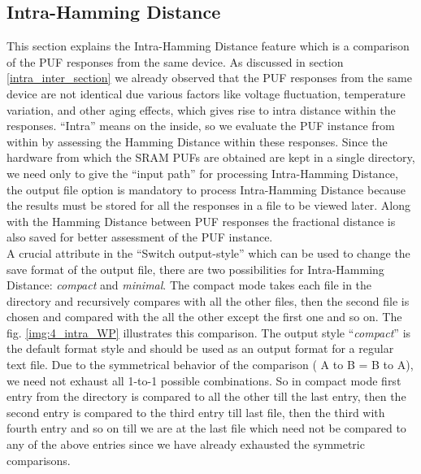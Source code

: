 \subsection{Intra-Hamming Distance}
\label{intra_hd_section}
This section explains the Intra-Hamming Distance feature which is a comparison of the PUF responses from the same device. As discussed in section \ref{intra_inter_section} we already observed that the PUF responses from the same device are not identical due various factors like voltage fluctuation,  temperature variation, and other aging effects, which gives rise to intra distance within the responses. ``Intra'' means on the inside, so we evaluate the PUF instance from within by assessing the Hamming Distance within
these responses. Since the hardware from which the SRAM PUFs are obtained are kept in a single directory, we need only to give the ``input path'' for processing Intra-Hamming Distance, the output file option is mandatory to process Intra-Hamming Distance because the results must be stored for all the responses in a file to be viewed later. Along with the Hamming Distance between PUF responses the fractional distance is also saved for better assessment of the PUF instance.\\

A crucial attribute in the ``Switch output-style'' which can be used to change the save format of the output file, there are two possibilities for Intra-Hamming Distance: \emph{compact} and \emph{minimal}. The compact mode takes each file in the directory and recursively compares with all the other files, then the second file is chosen and compared with the all the other except the first one and so on. The fig. \ref{img:4_intra_WP} illustrates this comparison.  The output style ``\emph{compact}'' is the default format style and should be used
as an output format for a regular text file. Due to the symmetrical behavior of the comparison ( A to B = B to A), we need not exhaust all 1-to-1 possible combinations. So in compact mode first entry from the directory is compared to all the other till the last entry, then the second entry is compared to the third entry till last file, then the third with fourth entry and so on till we are at the last file which need not be compared to any of the above entries since we have already exhausted the
symmetric comparisons.\\


